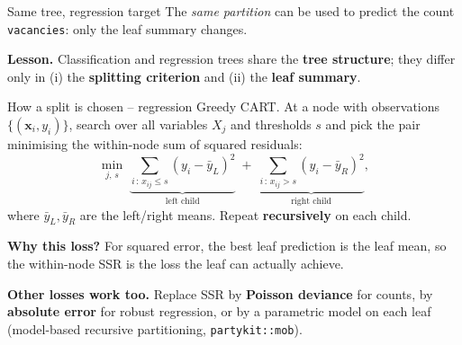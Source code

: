 \documentclass[10pt,ignorenonframetext,aspectratio=169]{beamer}
\newcommand{\bx}{\boldsymbol{x}}
\begin{document}
\begin{frame}{Same tree, regression target}
The \emph{same partition} can be used to predict the count \texttt{vacancies}: only the leaf summary changes.

\medskip
\centering
{}

\medskip
\textbf{Lesson.} Classification and regression trees share the \textbf{tree structure}; they differ only in (i) the \textbf{splitting criterion} and (ii) the \textbf{leaf summary}.
\end{frame}


\begin{frame}{How a split is chosen -- regression}
Greedy CART. At a node with observations $\{(\bx_i, y_i)\}$, search over all variables $X_j$ and thresholds $s$ and pick the pair minimising the within-node sum of squared residuals:
\[
\min_{j,\,s} \;
\underbrace{\sum_{i \,:\, x_{ij} \le s} (y_i - \bar y_L)^2}_{\text{left child}}
\;+\;
\underbrace{\sum_{i \,:\, x_{ij} > s} (y_i - \bar y_R)^2}_{\text{right child}},
\]
where $\bar y_L, \bar y_R$ are the left/right means. Repeat \textbf{recursively} on each child.

\medskip
\textbf{Why this loss?} For squared error, the best leaf prediction is the leaf mean, so the within-node SSR is the loss the leaf can actually achieve.

\medskip
\textbf{Other losses work too.} Replace SSR by \textbf{Poisson deviance} for counts, by \textbf{absolute error} for robust regression, or by a parametric model on each leaf (model-based recursive partitioning, \texttt{partykit::mob}).
\end{frame}
\end{document}
